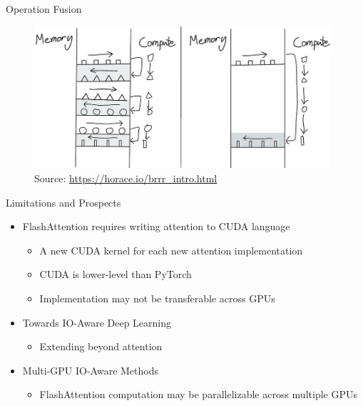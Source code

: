
\begin{vbframe}{Operation Fusion}

\vfill

\begin{figure}
	\centering
	\includegraphics[width = 11cm]{./figure/op_fusion.png} \\ 
	{\footnotesize Source: \href{https://horace.io/brrr_intro.html}{\url{https://horace.io/brrr_intro.html}}}
\end{figure}

\vfill

\end{vbframe}


\begin{vbframe}{Limitations and Prospects}

\vfill

\begin{itemize}
	\item FlashAttention requires writing attention to CUDA language
	\begin{itemize}
		\item A new CUDA kernel for each new attention implementation
		\item CUDA is lower-level than PyTorch
		\item Implementation may not be transferable across GPUs
	\end{itemize}
	\item Towards IO-Aware Deep Learning
	\begin{itemize}
		\item Extending beyond attention
	\end{itemize}
	\item Multi-GPU IO-Aware Methods
	\begin{itemize}
		\item FlashAttention computation may be parallelizable across multiple GPUs
	\end{itemize}
\end{itemize}

\vfill

\end{vbframe}

